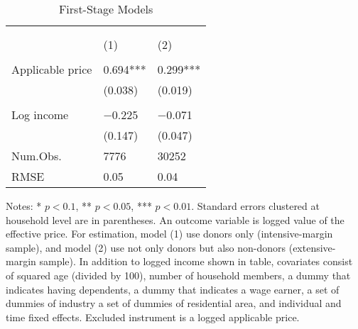 \begin{table}

\caption{First-Stage Models\label{tab:main-stage1}}
\centering
\fontsize{8}{10}\selectfont
\begin{threeparttable}
\begin{tabular}[t]{l>{\centering\arraybackslash}p{18.75em}>{\centering\arraybackslash}p{18.75em}}
\toprule
\multicolumn{1}{c}{ } & \multicolumn{2}{c}{Effective price} \\
\cmidrule(l{3pt}r{3pt}){2-3}
\multicolumn{1}{c}{ } & \multicolumn{1}{c}{Donors (Intensive-margin)} & \multicolumn{1}{c}{Donors and Non-donors (Extensive-margin)} \\
\cmidrule(l{3pt}r{3pt}){2-2} \cmidrule(l{3pt}r{3pt}){3-3}
  & (1) & (2)\\
\midrule
\addlinespace[0.3em]
\multicolumn{3}{l}{\textit{Excluded instruments}}\\
\hspace{1em}Applicable price & \num{0.694}*** & \num{0.299}***\\
\hspace{1em} & (\num{0.038}) & (\num{0.019})\\
\addlinespace[0.3em]
\multicolumn{3}{l}{\textit{Covariates}}\\
\hspace{1em}Log income & \num{-0.225} & \num{-0.071}\\
\hspace{1em} & (\num{0.147}) & (\num{0.047})\\
\midrule
Num.Obs. & \num{7776} & \num{30252}\\
RMSE & \num{0.05} & \num{0.04}\\
\bottomrule
\end{tabular}
\begin{tablenotes}
\item Notes: * $p < 0.1$, ** $p < 0.05$, *** $p < 0.01$. Standard errors clustered at household level are in parentheses. An outcome variable is logged value of the effective price. For estimation, model (1) use donors only (intensive-margin sample), and model (2) use not only donors but also non-donors (extensive-margin sample). In addition to logged income shown in table, covariates consist of squared age (divided by 100), number of household members, a dummy that indicates having dependents, a dummy that indicates a wage earner, a set of dummies of industry a set of dummies of residential area, and individual and time fixed effects. Excluded instrument is a logged applicable price.
\end{tablenotes}
\end{threeparttable}
\end{table}
